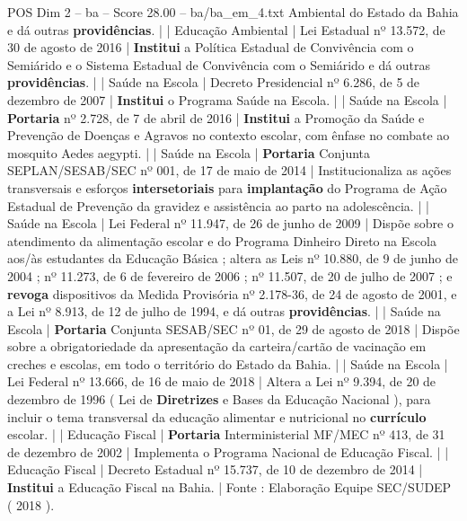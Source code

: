 \begin{textsample}{POS Dim 2 – ba – Score 28.00 – ba/ba\_em\_4.txt}
Ambiental do Estado da Bahia e dá outras \textbf{providências}. | | Educação Ambiental | Lei Estadual nº 13.572, de 30 de agosto de 2016 | \textbf{Institui} a Política Estadual de Convivência com o Semiárido e o Sistema Estadual de Convivência com o Semiárido e dá outras \textbf{providências}. | | Saúde na Escola | Decreto Presidencial nº 6.286, de 5 de dezembro de 2007 | \textbf{Institui} o Programa Saúde na Escola. | | Saúde na Escola | \textbf{Portaria} nº 2.728, de 7 de abril de 2016 | \textbf{Institui} a Promoção da Saúde e Prevenção de Doenças e Agravos no contexto escolar, com ênfase no combate ao mosquito Aedes aegypti. | | Saúde na Escola | \textbf{Portaria} Conjunta SEPLAN/SESAB/SEC nº 001, de 17 de maio de 2014 | Institucionaliza as ações transversais e esforços \textbf{intersetoriais} para \textbf{implantação} do Programa de Ação Estadual de Prevenção da gravidez e assistência ao parto na adolescência. | | Saúde na Escola | Lei Federal nº 11.947, de 26 de junho de 2009 | Dispõe sobre o atendimento da alimentação escolar e do Programa Dinheiro Direto na Escola aos/às estudantes da Educação Básica ; altera as Leis nº 10.880, de 9 de junho de 2004 ; nº 11.273, de 6 de fevereiro de 2006 ; nº 11.507, de 20 de julho de 2007 ; e \textbf{revoga} dispositivos da Medida Provisória nº 2.178-36, de 24 de agosto de 2001, e a Lei nº 8.913, de 12 de julho de 1994, e dá outras \textbf{providências}. | | Saúde na Escola | \textbf{Portaria} Conjunta SESAB/SEC nº 01, de 29 de agosto de 2018 | Dispõe sobre a obrigatoriedade da apresentação da carteira/cartão de vacinação em creches e escolas, em todo o território do Estado da Bahia. | | Saúde na Escola | Lei Federal nº 13.666, de 16 de maio de 2018 | Altera a Lei nº 9.394, de 20 de dezembro de 1996 ( Lei de \textbf{Diretrizes} e Bases da Educação Nacional ), para incluir o tema transversal da educação alimentar e nutricional no \textbf{currículo} escolar. | | Educação Fiscal | \textbf{Portaria} Interministerial MF/MEC nº 413, de 31 de dezembro de 2002 | Implementa o Programa Nacional de Educação Fiscal. | | Educação Fiscal | Decreto Estadual nº 15.737, de 10 de dezembro de 2014 | \textbf{Institui} a Educação Fiscal na Bahia. | Fonte : Elaboração Equipe SEC/SUDEP ( 2018 ).

\end{textsample}
